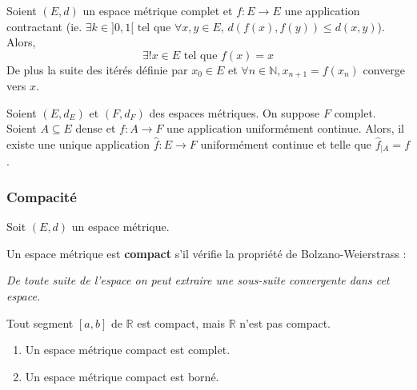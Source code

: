   \begin{application}
    Soient $(E,d)$ un espace métrique complet et $f : E \rightarrow E$ une application contractant (ie. $\exists k \in ]0,1[ \text{ tel que } \forall x, y \in E, \, d(f(x), f(y)) \leq d(x, y)$). Alors,
    \[ \exists! x \in E \text{ tel que } f(x) = x \]
    De plus la suite des itérés définie par $x_0 \in E$ et $\forall n \in \mathbb{N}, x_{n+1} = f(x_n)$ converge vers $x$.
  \end{application}

  \begin{application}
    Soient $(E,d_E)$ et $(F,d_F)$ des espaces métriques. On suppose $F$ complet. Soient $A \subseteq E$ dense et $f : A \rightarrow F$ une application uniformément continue. Alors, il existe une unique application $\widehat{f} : E \rightarrow F$ uniformément continue et telle que $\widehat{f}_{|A} = f$.
  \end{application}

  \subsubsection{Compacité}

  \label{206-2}


  Soit $(E, d)$ un espace métrique.

  \begin{definition}
    Un espace métrique est \textbf{compact} s'il vérifie la propriété de Bolzano-Weierstrass :
    \begin{center}
      \textit{De toute suite de l'espace on peut extraire une sous-suite convergente dans cet espace.}
    \end{center}
  \end{definition}

  \begin{example}
    Tout segment $[a,b]$ de $\mathbb{R}$ est compact, mais $\mathbb{R}$ n'est pas compact.
  \end{example}

  \begin{proposition}
    \begin{enumerate}[label=(\roman*)]
      \item Un espace métrique compact est complet.
      \item Un espace métrique compact est borné.
    \end{enumerate}
  \end{proposition}

